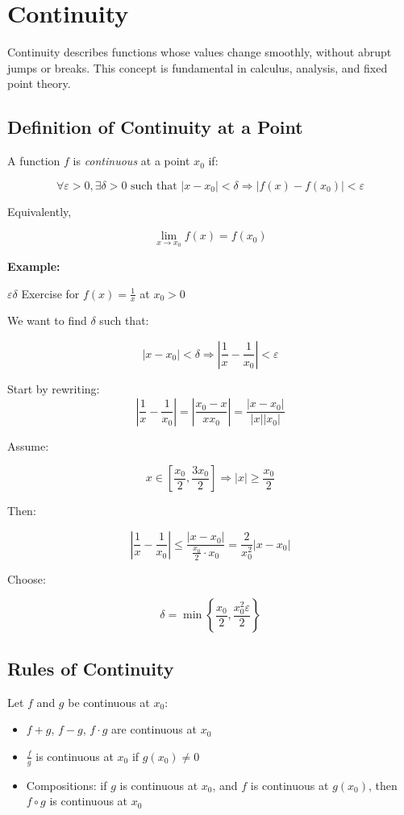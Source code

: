 \newpage
\section{Continuity}

Continuity describes functions whose values change smoothly, without abrupt jumps or breaks. 
This concept is fundamental in calculus, analysis, and fixed point theory.

\subsection{Definition of Continuity at a Point}

A function \(f\) is \emph{continuous} at a point \(x_0\) if:

\[
    \forall \varepsilon > 0, \exists \delta > 0 \text{ such that } |x - x_0| < \delta \Rightarrow |f(x) - f(x_0)| < \varepsilon
\]

Equivalently,

\[
    \lim_{x \to x_0} f(x) = f(x_0)
\]

\textbf{Example:} 

\(\varepsilon \delta\) Exercise for \(f(x) = \frac{1}{x}\) at \(x_0 > 0\)

We want to find \(\delta\) such that:

\[
    |x - x_0| < \delta \Rightarrow \left|\frac{1}{x} - \frac{1}{x_0}\right| < \varepsilon
\]

Start by rewriting:
\[
    \left|\frac{1}{x} - \frac{1}{x_0}\right| = \left|\frac{x_0 - x}{xx_0}\right| = \frac{|x - x_0|}{|x||x_0|}
\]

Assume:

\[
    x \in \left[\frac{x_0}{2}, \frac{3x_0}{2}\right] \Rightarrow |x| \ge \frac{x_0}{2}
\]

Then:

\[
    \left|\frac{1}{x} - \frac{1}{x_0}\right| \le \frac{|x - x_0|}{\frac{x_0}{2} \cdot x_0} = \frac{2}{x_0^2} |x - x_0|
\]

Choose:

\[
    \delta = \min\left\{\frac{x_0}{2}, \frac{x_0^2 \varepsilon}{2} \right\}
\]

\subsection{Rules of Continuity}

Let \(f\) and \(g\) be continuous at \(x_0\):

\begin{itemize}
    
    \item \(f + g\), \(f - g\), \(f \cdot g\) are continuous at \(x_0\)
    
    \item \(\frac{f}{g}\) is continuous at \(x_0\) if \(g(x_0) \ne 0\)
    
    \item Compositions: if \(g\) is continuous at \(x_0\), and \(f\) is continuous at \(g(x_0)\), 
    then \(f \circ g\) is continuous at \(x_0\)

\end{itemize}

